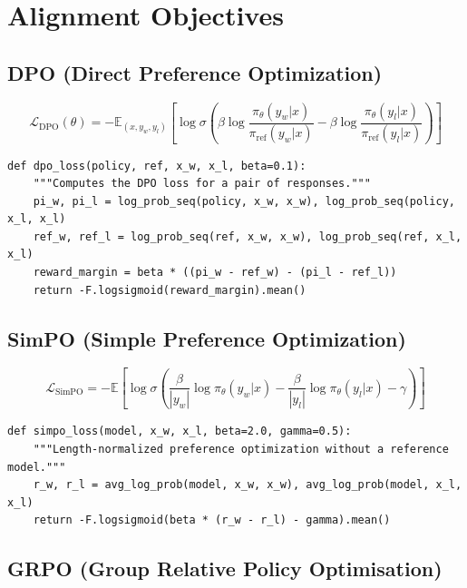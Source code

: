 \section{Alignment Objectives}
\label{app:alignment}

\subsection{DPO (Direct Preference Optimization)}
\label{form:dpo}

\[
  \mathcal{L}_\mathrm{DPO}(\theta) = -\mathbb{E}_{(x,y_w,y_l)}\!\left[ \log\sigma\!\left( \beta\log\frac{\pi_\theta(y_w|x)}{\pi_\mathrm{ref}(y_w|x)} - \beta\log\frac{\pi_\theta(y_l|x)}{\pi_\mathrm{ref}(y_l|x)} \right) \right]
\]

\begin{lstlisting}[style=pythonstyle, caption={Direct Preference Optimization loss}, label=lst:dpo]
def dpo_loss(policy, ref, x_w, x_l, beta=0.1):
    """Computes the DPO loss for a pair of responses."""
    pi_w, pi_l = log_prob_seq(policy, x_w, x_w), log_prob_seq(policy, x_l, x_l)
    ref_w, ref_l = log_prob_seq(ref, x_w, x_w), log_prob_seq(ref, x_l, x_l)
    reward_margin = beta * ((pi_w - ref_w) - (pi_l - ref_l))
    return -F.logsigmoid(reward_margin).mean()
\end{lstlisting}

\subsection{SimPO (Simple Preference Optimization)}
\label{form:simpo}

\[
  \mathcal{L}_\mathrm{SimPO} = -\mathbb{E}\!\left[\log\sigma\!\left( \frac{\beta}{|y_w|}{\log\pi_\theta(y_w|x)} - \frac{\beta}{|y_l|}{\log\pi_\theta(y_l|x)} - \gamma \right)\right]
\]

\begin{lstlisting}[style=pythonstyle, caption={SimPO loss}, label=lst:simpo]
def simpo_loss(model, x_w, x_l, beta=2.0, gamma=0.5):
    """Length-normalized preference optimization without a reference model."""
    r_w, r_l = avg_log_prob(model, x_w, x_w), avg_log_prob(model, x_l, x_l)
    return -F.logsigmoid(beta * (r_w - r_l) - gamma).mean()
\end{lstlisting}

\subsection{GRPO (Group Relative Policy Optimisation)}
\label{form:grpo}


